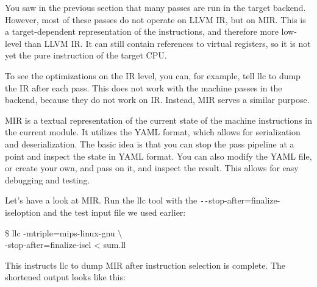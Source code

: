 You saw in the previous section that many passes are run in the target backend. However, most of these passes do not operate on LLVM IR, but on MIR. This is a target-dependent representation of the instructions, and therefore more low-level than LLVM IR. It can still contain references to virtual registers, so it is not yet the pure instruction of the target CPU.\par

To see the optimizations on the IR level, you can, for example, tell llc to dump the IR after each pass. This does not work with the machine passes in the backend, because they do not work on IR. Instead, MIR serves a similar purpose.\par

MIR is a textual representation of the current state of the machine instructions in the current module. It utilizes the YAML format, which allows for serialization and deserialization. The basic idea is that you can stop the pass pipeline at a point and inspect the state in YAML format. You can also modify the YAML file, or create your own, and pass on it, and inspect the result. This allows for easy debugging and testing.\par

Let's have a look at MIR. Run the llc tool with the \verb|--|stop-after=finalize-iseloption and the test input file we used earlier:\par

\begin{tcolorbox}[colback=white,colframe=black]
\$ llc -mtriple=mips-linux-gnu $\setminus$ \\
\hspace*{2cm}-stop-after=finalize-isel < sum.ll
\end{tcolorbox}

This instructs llc to dump MIR after instruction selection is complete. The shortened output looks like this:\par

